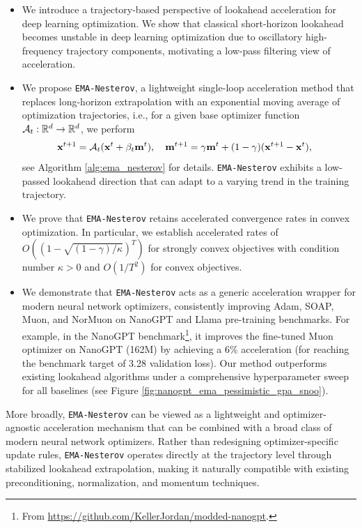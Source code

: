 \documentclass{article}
\theoremstyle{plain}
\theoremstyle{definition}
\theoremstyle{remark}
\def\algname{{\tt EMA-Nesterov}}
\def\bx{\mathbf{x}}
\def\bm{\mathbf{m}}
\begin{document}
\begin{itemize}[leftmargin=*]
\item We introduce a trajectory-based perspective of lookahead acceleration for deep learning optimization. We show that classical short-horizon lookahead becomes unstable in deep learning optimization due to oscillatory high-frequency trajectory components, motivating a low-pass filtering view of acceleration. 

\item We propose {\algname}, a lightweight single-loop acceleration method that replaces long-horizon extrapolation with an exponential moving average of optimization trajectories, i.e., for a given base optimizer function ${\cal A}_t: \mathbb{R}^d \rightarrow \mathbb{R}^d$, we perform
\begin{equation}
\begin{aligned}
\bx^{t+1} &= {\cal A}_t(\bx^t + \beta_t \bm^t), \quad 
\bm^{t+1} =  \gamma \bm^t + (1-\gamma) (\bx^{t+1} -  \bx^t),
\end{aligned}
\end{equation}
see Algorithm \ref{alg:ema_nesterov} for details.
{\algname} exhibits a low-passed lookahead direction that can adapt to a varying trend in the training trajectory.

\item We prove that {\algname} retains accelerated convergence rates in convex optimization. In particular, we establish accelerated rates of $O((1-\sqrt{(1-\gamma)/\kappa})^T)$ for strongly convex objectives with condition number $\kappa > 0$ and $O(1/T^2)$ for convex objectives.

\item We demonstrate that {\algname} acts as a generic acceleration wrapper for modern neural network optimizers, consistently improving Adam, SOAP, Muon, and NorMuon on NanoGPT and Llama pre-training benchmarks. For example, in the NanoGPT benchmark\footnote{From \url{https://github.com/KellerJordan/modded-nanogpt}.}, it improves the fine-tuned Muon optimizer on NanoGPT (162M) by achieving a 6\% acceleration (for reaching the benchmark target of 3.28 validation loss).
Our method outperforms existing lookahead algorithms under a comprehensive hyperparameter sweep for all baselines (see Figure \ref{fig:nanogpt_ema_pessimistic_gpa_snoo}). 
\end{itemize}


More broadly, {\algname} can be viewed as a lightweight and optimizer-agnostic acceleration mechanism that can be combined with a broad class of modern neural network optimizers. Rather than redesigning optimizer-specific update rules, {\algname} operates directly at the trajectory level through stabilized lookahead extrapolation, making it naturally compatible with existing preconditioning, normalization, and momentum techniques.
\end{document}
